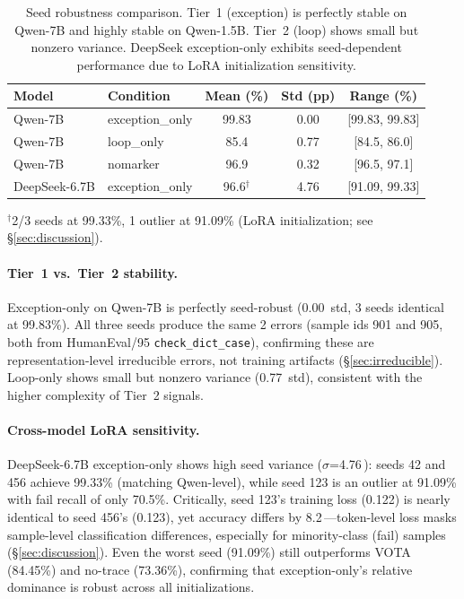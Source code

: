\documentclass[11pt]{article}
\newcommand{\pp}{\,\text{pp}}
\begin{document}
\begin{table}[t]
\centering
\small
\caption{Seed robustness comparison. Tier~1 (exception) is perfectly stable on Qwen-7B and highly stable on Qwen-1.5B. Tier~2 (loop) shows small but nonzero variance. DeepSeek exception-only exhibits seed-dependent performance due to LoRA initialization sensitivity.}
\label{tab:seed}
\begin{tabular}{@{}llccc@{}}
\toprule
\textbf{Model} & \textbf{Condition} & \textbf{Mean (\%)} & \textbf{Std (pp)} & \textbf{Range (\%)} \\
\midrule
Qwen-7B & exception\_only & 99.83 & 0.00 & [99.83, 99.83] \\
Qwen-7B & loop\_only & 85.4 & 0.77 & [84.5, 86.0] \\
Qwen-7B & nomarker & 96.9 & 0.32 & [96.5, 97.1] \\
\midrule
DeepSeek-6.7B & exception\_only & 96.6$^\dagger$ & 4.76 & [91.09, 99.33] \\
\bottomrule
\end{tabular}
\vspace{2pt}
\begin{flushleft}
\footnotesize
$^\dagger$2/3 seeds at 99.33\%, 1 outlier at 91.09\% (LoRA initialization; see \S\ref{sec:discussion}).
\end{flushleft}
\end{table}

\paragraph{Tier~1 vs.\ Tier~2 stability.}
Exception-only on Qwen-7B is perfectly seed-robust (0.00\pp{} std, 3 seeds identical at 99.83\%).
All three seeds produce the same 2 errors (sample ids 901 and 905, both from HumanEval/95 \texttt{check\_dict\_case}), confirming these are representation-level irreducible errors, not training artifacts (\S\ref{sec:irreducible}).
Loop-only shows small but nonzero variance (0.77\pp{} std), consistent with the higher complexity of Tier~2 signals.

\paragraph{Cross-model LoRA sensitivity.}
DeepSeek-6.7B exception-only shows high seed variance ($\sigma$=4.76\pp): seeds 42 and 456 achieve 99.33\% (matching Qwen-level), while seed 123 is an outlier at 91.09\% with fail recall of only 70.5\%.
Critically, seed 123's training loss (0.122) is nearly identical to seed 456's (0.123), yet accuracy differs by 8.2\pp---token-level loss masks sample-level classification differences, especially for minority-class (fail) samples (\S\ref{sec:discussion}).
Even the worst seed (91.09\%) still outperforms VOTA (84.45\%) and no-trace (73.36\%), confirming that exception-only's relative dominance is robust across all initializations.
\end{document}
